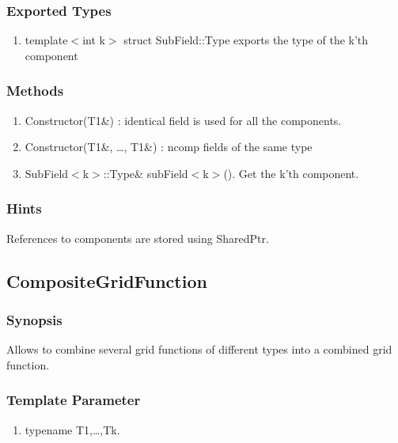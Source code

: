 \documentclass[11pt,a4paper,DIV11,%
notitlepage,oneside,abstracton,%
bibtotoc]{scrartcl}
\begin{document}
\subsubsection{Exported Types}

\begin{enumerate}[1)]
\item template$<$int k$>$ struct SubField::Type exports the type of
  the k'th component
\end{enumerate}

\subsubsection{Methods}

\begin{enumerate}[1)]
\item Constructor(T1\&) : identical field is used for all the components. 
\item Constructor(T1\&, \ldots , T1\&) : ncomp fields of the same type
\item SubField$<$k$>$::Type\& subField$<$k$>$(). Get the k'th component.
\end{enumerate}

\subsubsection{Hints}

References to components are stored using SharedPtr.

\subsection{CompositeGridFunction}

\subsubsection{Synopsis}

Allows to combine several grid functions of different types into a
combined grid function.

\subsubsection{Template Parameter}

\begin{enumerate}[1)]
\item typename T1,\ldots,Tk.
\end{enumerate}
\end{document}
